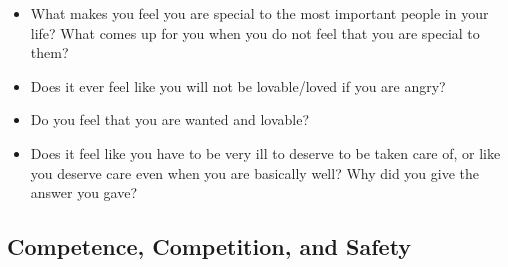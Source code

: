 \documentclass[12pt,letterpaper]{book}
\begin{document}
\begin{itemize}
    \item What makes you feel you are special to the most important people in your life? What comes up for you when you do not feel that you are special to them?
    \item Does it ever feel like you will not be lovable/loved if you are angry?
    \item Do you feel that you are wanted and lovable?
    \item Does it feel like you have to be very ill to deserve to be taken care of, or like you deserve care even when you are basically well? Why did you give the answer you gave?
\end{itemize}

\subsection*{Competence, Competition, and Safety}
\end{document}
